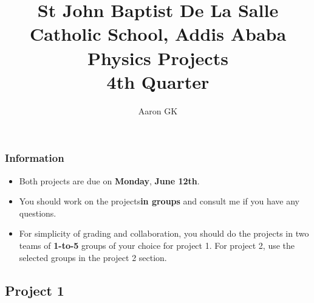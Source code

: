 \documentclass[11pt,addpoints]{exam}
\author{Aaron GK}
\begin{document}
	\title{St John Baptist De La Salle Catholic School, Addis Ababa\\
		\large Physics Projects \\
		4th Quarter}
	\maketitle
	\begin{center}
		\subsubsection*{Information}
		\begin{itemize}
			\item Both projects are due on \textbf{Monday}, \textbf{June 12th}.
			\item You should work on the projects\textbf{in groups} and consult me if you have any questions.
			\item For simplicity of grading and collaboration, you should do the projects in two teams of \textbf{1-to-5} groups of your choice for project 1. For project 2, use the selected groups in the project 2 section.
		\end{itemize}
	\end{center}
	\begin{center}
		\subsection*{Project 1}
	\end{center}
\end{document}
